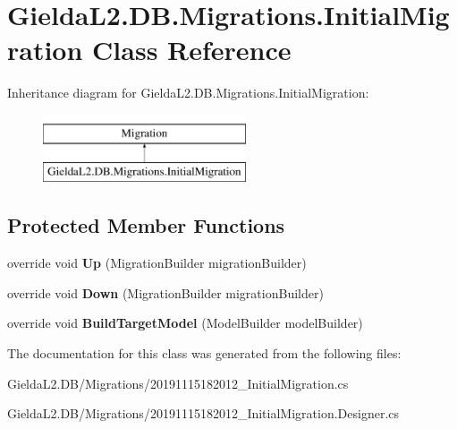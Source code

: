 \hypertarget{class_gielda_l2_1_1_d_b_1_1_migrations_1_1_initial_migration}{}\section{Gielda\+L2.\+D\+B.\+Migrations.\+Initial\+Migration Class Reference}
\label{class_gielda_l2_1_1_d_b_1_1_migrations_1_1_initial_migration}
Inheritance diagram for Gielda\+L2.\+D\+B.\+Migrations.\+Initial\+Migration\+:\begin{figure}[H]
\begin{center}
\leavevmode
\includegraphics[height=2.000000cm]{class_gielda_l2_1_1_d_b_1_1_migrations_1_1_initial_migration}
\end{center}
\end{figure}
\subsection*{Protected Member Functions}
\begin{DoxyCompactItemize}
\item 
\mbox{\label{class_gielda_l2_1_1_d_b_1_1_migrations_1_1_initial_migration_ab940f14efa8440ff44edf82407a4a653}} 
override void {\bfseries Up} (Migration\+Builder migration\+Builder)
\item 
\mbox{\label{class_gielda_l2_1_1_d_b_1_1_migrations_1_1_initial_migration_a72ce1940312141971e5553264816a315}} 
override void {\bfseries Down} (Migration\+Builder migration\+Builder)
\item 
\mbox{\label{class_gielda_l2_1_1_d_b_1_1_migrations_1_1_initial_migration_a6295789d48c7de37dc4bee295bb723ea}} 
override void {\bfseries Build\+Target\+Model} (Model\+Builder model\+Builder)
\end{DoxyCompactItemize}


The documentation for this class was generated from the following files\+:\begin{DoxyCompactItemize}
\item 
Gielda\+L2.\+D\+B/\+Migrations/20191115182012\+\_\+\+Initial\+Migration.\+cs\item 
Gielda\+L2.\+D\+B/\+Migrations/20191115182012\+\_\+\+Initial\+Migration.\+Designer.\+cs\end{DoxyCompactItemize}
